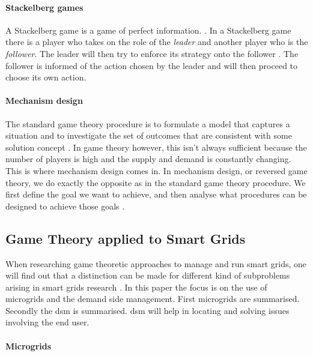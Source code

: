 \paragraph{Stackelberg games}
A Stackelberg game is a game of perfect information. \cite{CourseInGameTheory}.
In a Stackelberg game there is a player who takes on the role of the \textit{leader} and another player who is the \textit{follower}. The leader will then try to enforce its strategy onto the follower \cite{ShohamLeyton-Brown2008}. The follower is informed of the action chosen by the leader and will then proceed to choose its own action. 


\paragraph{Mechanism design}
The standard game theory procedure is to formulate a model that
captures a situation and to investigate the set of outcomes that are
consistent with some solution concept \cite{CourseInGameTheory}. In game theory however, this isn't always sufficient because the number of players is high and the supply and demand is constantly changing. This is where mechanism design comes in. In mechanism design, or reversed game theory, we do exactly the opposite as in the standard game theory procedure. We first define the goal we want to achieve, and then analyse what procedures can be designed to achieve those goals \cite{SalfatiRabinovici2014}. 


\subsection{Game Theory applied to Smart Grids}
When researching game theoretic approaches to manage and run smart grids, one will find out that a distinction can be made for different kind of subproblems arising in smart grids research \cite{keypaper}. In this paper the focus is on the use of microgrids and the demand side management. First microgrids are summarised. Secondly the \ac{dsm} is summarised. \ac{dsm} will help in locating and solving issues involving the end user. 

\paragraph{Microgrids}
